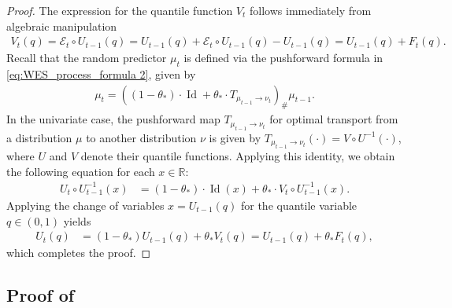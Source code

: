 \documentclass[a4paper, 11pt]{article}
\newcommand{\R}{\mathbb{R}}
\theoremstyle{definition}
\begin{document}
\begin{proof}
    The expression for the quantile function $V_t$ follows immediately from algebraic manipulation
	\begin{align}
		V_{t}(q) = \mathcal{E}_{t} \circ U_{t-1}(q) = U_{t-1}(q) + \mathcal{E}_{t} \circ U_{t-1}(q) - U_{t-1}(q) = U_{t-1}(q) + F_{t}(q) .
	\end{align}
    Recall that the random predictor $\mu_t$ is defined via the pushforward formula in \eqref{eq:WES_process_formula 2}, given by
    \begin{align}
    \mu_t = \left( (1 - \theta_*) \cdot \operatorname{Id} + \theta_* \cdot T_{\mu_{t-1} \to \nu_{t}} \right)_{\#} \mu_{t-1} .
    \end{align}
    In the univariate case, the pushforward map $T_{\mu_{t-1} \to \nu_{t}}$ for optimal transport from a distribution $\mu$ to another distribution $\nu$ is given by $T_{\mu_{t-1} \to \nu_{t}}(\cdot) = V \circ U^{-1}(\cdot)$, where $U$ and $V$ denote their quantile functions.
    Applying this identity, we obtain the following equation for each $x \in \R$:
	\begin{align}
		U_t \circ U_{t-1}^{-1} (x) & = (1 - \theta_*) \cdot \operatorname{Id}(x) + \theta_* \cdot V_{t} \circ U_{t-1}^{-1} (x) .
	\end{align}
    Applying the change of variables $x = U_{t-1}(q)$ for the quantile variable $q \in (0, 1)$ yields
    \begin{align}
		U_t(q) & = (1 - \theta_*) U_{t-1}(q) + \theta_* V_{t}(q) = U_{t-1}(q) + \theta_* F_{t}(q) ,
	\end{align}
    which completes the proof.
\end{proof}



\subsection{Proof of } \label{apx:proof_stationarity}
\end{document}
